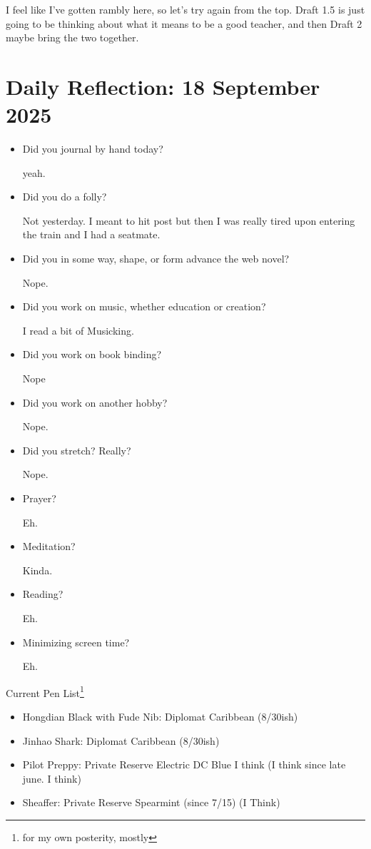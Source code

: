\documentclass[12pt]{article}
\renewcommand{\,}{\textsuperscript{,}}
\begin{document}
I feel like I've gotten rambly here, so let's try again from the top. 
Draft 1.5 is just going to be thinking about what it means to be a good teacher, and then Draft 2 maybe bring the two together.

\section{Daily Reflection: 18 September 2025}

\begin{itemize}

\item Did you journal by hand today?

yeah.

\item Did you do a folly?

Not yesterday. I meant to hit post but then I was really tired upon entering the train and I had a seatmate.

\item Did you in some way, shape, or form advance the web novel?

Nope.

\item Did you work on music, whether education or creation?

I read a bit of Musicking.

\item Did you work on book binding?

Nope

\item Did you work on another hobby?

Nope.

\item Did you stretch? Really?

Nope.

\item Prayer?

Eh.

\item Meditation?

Kinda.

\item Reading?

Eh.

\item Minimizing screen time?

Eh.

\end{itemize}

Current Pen List\footnote{for my own posterity, mostly}

\begin{itemize}  
\item Hongdian Black with Fude Nib: Diplomat Caribbean (8/30ish)  
\item Jinhao Shark: Diplomat Caribbean (8/30ish)  
\item Pilot Preppy: Private Reserve Electric DC Blue I think (I think since late june. I think)  
\item Sheaffer: Private Reserve Spearmint (since 7/15) (I Think)
\end{itemize}
\end{document}
